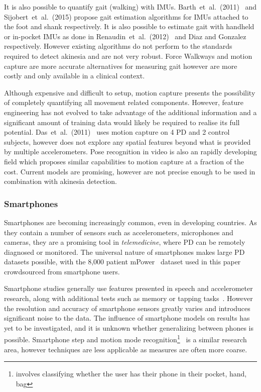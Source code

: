 \documentclass[12pt, twoside]{book}
\renewcommand\emph[1]{\textit{\color{USred}{#1}}}
\begin{document}
It is also possible to quantify gait (walking) with IMUs. Barth~et~al.~(2011)~\cite{barth2011biometric} and Sijobert~et~al.~(2015) \cite{sijobert2015implementation} propose gait estimation algorithms for IMUs attached to the foot and shank respectively. It is also possible to estimate gait with handheld or in-pocket IMUs as done in Renaudin~et~al.~(2012)~\cite{renaudin2012step} and Diaz and Gonzalez~\cite{diaz2014step} respectively. However existing algorithms do not perform to the standards required to detect akinesia and are not very robust. Force Walkways and motion capture are more accurate alternatives for measuring gait however are more costly and only available in a clinical context. 

Although expensive and difficult to setup, motion capture presents the possibility of completely quantifying all movement related components. However, feature engineering has not evolved to take advantage of the additional information and a significant amount of training data would likely be required to realise its full potential. Das~et~al.~(2011)~\cite{das2011quantitative} uses motion capture on 4 PD and 2 control subjects, however does not explore any spatial features beyond what is provided by multiple accelerometers. Pose recognition in video is also an rapidly developing field which proposes similar capabilities to motion capture at a fraction of the cost. Current models are promising, however are not precise enough to be used in combination with akinesia detection.

\subsubsection{Smartphones}
Smartphones are becoming increasingly common, even in developing countries. As they contain a number of sensors such as accelerometers, microphones and cameras, they are a promising tool in \textit{telemedicine}, where PD can be remotely diagnosed or monitored. The universal nature of smartphones makes large PD datasets possible, with the 8,000 patient mPower~\cite{mpower} dataset used in this paper crowdsourced from smartphone users.

Smartphone studies generally use features presented in speech and accelerometer research, along with additional tests such as memory or tapping tasks~\cite{tapping}. However the resolution and accuracy of smartphone sensors greatly varies and introduces significant noise to the data. The influence of smartphone models on results has yet to be investigated, and it is unknown whether generalizing between phones is possible. Smartphone step and motion mode recognition\footnote{\emph{Motion mode recognition} involves classifying whether the user has their phone in their pocket, hand, bag  }~\cite{motionmoderecognition, li2010multimodal} is a similar research area, however techniques are less applicable as measures are often more coarse.
\end{document}

